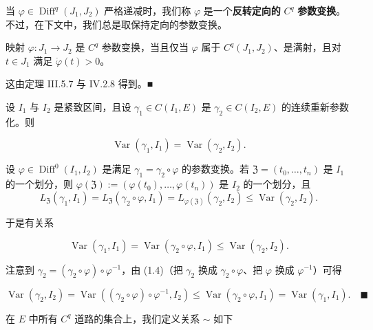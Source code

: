 \begin{remark}

\begin{items}
\item

当 $ \varphi \in \operatorname{Diff}^{q}(J_1,J_2) $ 严格递减时，我们称 $ \varphi $ 是一个\textbf{反转定向的} $ C^{q} $ \textbf{参数变换}。不过，在下文中，我们总是取保持定向的参数变换。

\item

映射 $ \varphi : J_1 \to J_2 $ 是 $ C^{q} $ 参数变换，当且仅当 $ \varphi $ 属于 $ C^{q}(J_1,J_2) $、是满射，且对 $ t \in J_1 $ 满足 $ \dot{\varphi}(t) > 0 $。

\proofhead
这由定理 III.5.7 与 IV.2.8 得到。\nobreak\hspace{0.35em}■
\item

设 $ I_1 $ 与 $ I_2 $ 是紧致区间，且设 $ \gamma_1 \in C(I_1,E) $ 是 $ \gamma_2 \in C(I_2,E) $ 的连续重新参数化。则

\[
\operatorname{Var}(\gamma_1,I_1) = \operatorname{Var}(\gamma_2,I_2) .
\]

\proofhead
设 $ \varphi \in \operatorname{Diff}^{0}(I_1,I_2) $ 是满足 $ \gamma_1 = \gamma_2 \circ \varphi $ 的参数变换。若 $ \mathfrak{Z} = (t_0,\ldots,t_n) $ 是 $ I_1 $ 的一个划分，则 $ \varphi(\mathfrak{Z}) := (\varphi(t_0),\ldots,\varphi(t_n)) $ 是 $ I_2 $ 的一个划分，且
\[
L_{\mathfrak{Z}}(\gamma_1,I_1) = L_{\mathfrak{Z}}(\gamma_2 \circ \varphi,I_1) = L_{\varphi(\mathfrak{Z})}(\gamma_2,I_2) \le \operatorname{Var}(\gamma_2,I_2) .
\]

于是有关系

\begin{equation}
\operatorname{Var}(\gamma_1,I_1) = \operatorname{Var}(\gamma_2 \circ \varphi,I_1) \le \operatorname{Var}(\gamma_2,I_2) .\tag{1.4}
\end{equation}

注意到 $ \gamma_2 = (\gamma_2 \circ \varphi) \circ \varphi^{-1} $，由 (1.4)（把 $ \gamma_2 $ 换成 $ \gamma_2 \circ \varphi $、把 $ \varphi $ 换成 $ \varphi^{-1} $）可得

\[
\operatorname{Var}(\gamma_2,I_2) = \operatorname{Var}((\gamma_2 \circ \varphi) \circ \varphi^{-1},I_2) \le \operatorname{Var}(\gamma_2 \circ \varphi,I_1) = \operatorname{Var}(\gamma_1,I_1) .\quad\blacksquare
\]

在 $ E $ 中所有 $ C^{q} $ 道路的集合上，我们定义关系 $ \sim $ 如下


\end{items}
\end{remark}
